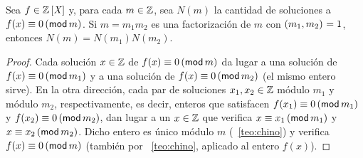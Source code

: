 \begin{coroChino}\label{coro:chino:polinomial}
	Sea $f\in\polinomios\Enteros$ y, para cada $m\in\Enteros$,
	sea $N(m)$ la cantidad de soluciones a $f(x)\equiv 0\tmodulo[m]$.
	Si $m=m_1m_2$ es una factorizaci\'on de $m$ con $\mcd{m_1,m_2}=1$,
	entonces $N(m)=N(m_1)N(m_2)$.
\end{coroChino}

\begin{proof}
	Cada soluci\'on $x\in\Enteros$ de $f(x)\equiv 0\tmodulo[m]$
	da lugar a una soluci\'on de $f(x)\equiv 0\tmodulo[m_1]$ y a
	una soluci\'on de $f(x)\equiv 0\tmodulo[m_2]$ (el mismo entero sirve).
	En la otra direcci\'on,
	cada par de soluciones $x_1,x_2\in\Enteros$ m\'odulo $m_1$ y
	m\'odulo $m_2$, respectivamente, es decir, enteros que satisfacen
	$f(x_1)\equiv 0\tmodulo[m_1]$ y $f(x_2)\equiv 0\tmodulo[m_2]$,
	dan lugar a un $x\in\Enteros$ que verifica
	$x\equiv x_1\tmodulo[m_1]$ y $x\equiv x_2\tmodulo[m_2]$.
	Dicho entero es \'unico m\'odulo $m$ (\teoname~\ref{teo:chino})
	y verifica $f(x)\equiv 0\tmodulo[m]$ (tambi\'en por
	\teoname~\ref{teo:chino}, aplicado al entero $f(x)$).
\end{proof}

